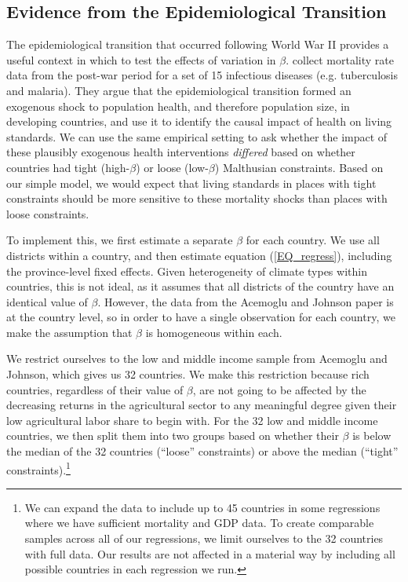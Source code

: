 \documentclass[11pt]{article}
\begin{document}
\subsection{Evidence from the Epidemiological Transition}\label{SEC_ajtest}
The epidemiological transition that occurred following World War II provides a useful context in which to test the effects of variation in $\beta$. \cite{aj07} collect mortality rate data from the post-war period for a set of 15 infectious diseases (e.g. tuberculosis and malaria). They argue that the epidemiological transition formed an exogenous shock to population health, and therefore population size, in developing countries, and use it to identify the causal impact of health on living standards. We can use the same empirical setting to ask whether the impact of these plausibly exogenous health interventions \textit{differed} based on whether countries had tight (high-$\beta$) or loose (low-$\beta$) Malthusian constraints. Based on our simple model, we would expect that living standards in places with tight constraints should be more sensitive to these mortality shocks than places with loose constraints.

To implement this, we first estimate a separate $\beta$ for each country. We use all districts within a country, and then estimate equation (\ref{EQ_regress}), including the province-level fixed effects. Given heterogeneity of climate types within countries, this is not ideal, as it assumes that all districts of the country have an identical value of $\beta$. However, the data from the Acemoglu and Johnson paper is at the country level, so in order to have a single observation for each country, we make the assumption that $\beta$ is homogeneous within each.

We restrict ourselves to the low and middle income sample from Acemoglu and Johnson, which gives us 32 countries. We make this restriction because rich countries, regardless of their value of $\beta$, are not going to be affected by the decreasing returns in the agricultural sector to any meaningful degree given their low agricultural labor share to begin with. For the 32 low and middle income countries, we then split them into two groups based on whether their $\beta$ is below the median of the 32 countries (``loose'' constraints) or above the median (``tight'' constraints).\footnote{We can expand the data to include up to 45 countries in some regressions where we have sufficient mortality and GDP data. To create comparable samples across all of our regressions, we limit ourselves to the 32 countries with full data. Our results are not affected in a material way by including all possible countries in each regression we run.}
\end{document}
